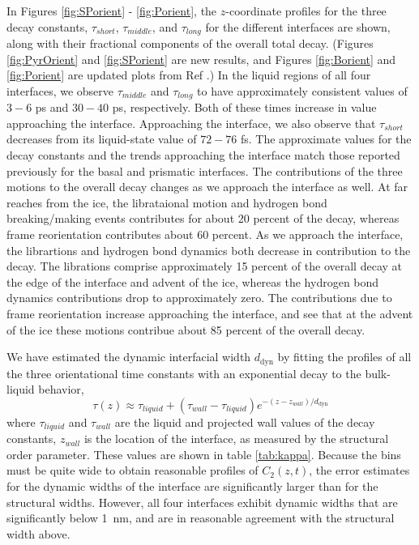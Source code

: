 \documentclass[aps,jcp,preprint,showpacs,superscriptaddress,groupedaddress]{revtex4}  %
\begin{document}
In Figures \ref{fig:SPorient} - \ref{fig:Porient}, the $z$-coordinate
profiles for the three decay constants, $\tau_{short}$,
$\tau_{middle}$, and $\tau_{long}$ for the different interfaces are
shown, along with their fractional components of the overall total decay.
(Figures \ref{fig:PyrOrient} and \ref{fig:SPorient} are new results, 
and Figures \ref{fig:Borient} and \ref{fig:Porient} are
updated plots from Ref \citealp{Louden13}.)  In the liquid regions of
all four interfaces, we observe $\tau_{middle}$ and $\tau_{long}$ to
have approximately consistent values of $3-6$ ps and $30-40$ ps,
respectively.  Both of these times increase in value approaching the
interface.  Approaching the interface, we also observe that
$\tau_{short}$ decreases from its liquid-state value of $72-76$ fs.
The approximate values for the decay constants and the trends
approaching the interface match those reported previously for the
basal and prismatic interfaces. The contributions of the three
motions to the overall decay changes as we approach the interface
as well. At far reaches from the ice, the librataional motion 
and hydrogen bond breaking/making events 
contributes for about 20 percent of the decay, whereas frame 
reorientation contributes about 60 percent. As we approach the 
interface, the librartions and hydrogen bond dynamics both 
decrease in contribution to the decay. The librations comprise 
approximately 15 percent of the overall decay at the edge of the 
interface and advent of the ice, whereas the hydrogen bond dynamics 
contributions drop to approximately zero. The contributions
due to frame reorientation increase approaching the interface, and see
that at the advent of the ice these motions contribue about 85 percent
of the overall decay. 

We have estimated the dynamic interfacial width $d_\mathrm{dyn}$ by
fitting the profiles of all the three orientational time constants
with an exponential decay to the bulk-liquid behavior,
\begin{equation}\label{tauFit}
  \tau(z)\approx\tau_{liquid}+(\tau_{wall}-\tau_{liquid})e^{-(z-z_{wall})/d_\mathrm{dyn}}
\end{equation}
where $\tau_{liquid}$ and $\tau_{wall}$ are the liquid and projected
wall values of the decay constants, $z_{wall}$ is the location of the
interface, as measured by the structural order parameter.  These
values are shown in table \ref{tab:kappa}. Because the bins must be
quite wide to obtain reasonable profiles of $C_2(z,t)$, the error
estimates for the dynamic widths of the interface are significantly
larger than for the structural widths.  However, all four interfaces
exhibit dynamic widths that are significantly below 1~nm, and are in
reasonable agreement with the structural width above.
\end{document}
